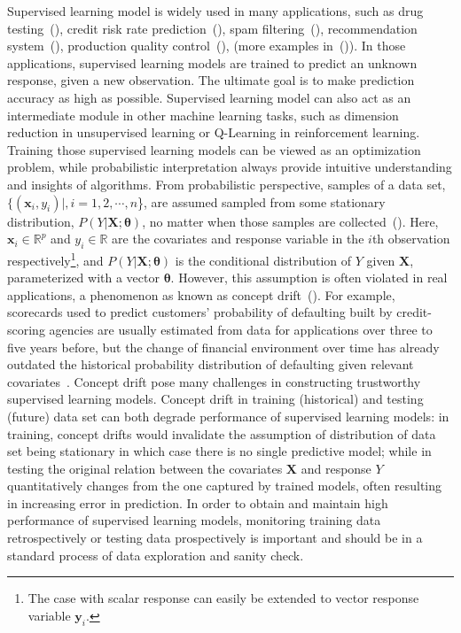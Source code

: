 \documentclass[twoside,11pt]{article}
\begin{document}
Supervised learning model is widely used in many applications, {such as} drug testing~(\cite{fong2015change}), credit risk rate prediction~(\cite{im2012time}), spam filtering~(\cite{carmona2010gnusmail}), recommendation system~(\cite{koren2009collaborative}), production quality control~(\cite{bui2018monitoring}), {(more examples in~(\cite{vzliobaite2016overview}))}. In those applications, supervised learning models are trained to predict an unknown response, given a new observation. The ultimate goal is to make prediction accuracy as high as possible. Supervised learning model can also act as an intermediate module in other machine learning tasks, such as dimension reduction in unsupervised learning or Q-Learning in reinforcement learning. Training those supervised learning models can be viewed as an optimization problem, while probabilistic interpretation always provide intuitive understanding and insights of algorithms. From probabilistic perspective, samples of a data set, {$\{ (\bm {x}_i, y_i)|, i=1,2,\cdots,n$\}}, are assumed sampled from some stationary distribution, $P (Y| \bm {X};\bm{\theta})$, no matter when those samples are collected~(\cite{hulten2001mining}). Here, {$\bm {x}_i \in \mathbb{R}^{p}$ and $y_i \in \mathbb{R}$ are the covariates and response variable in the $i$th observation respectively}\footnote{The case with scalar response can easily be extended to vector response variable $\bm {y}_i$.}, and $P (Y| \bm {X};\bm{\theta})$ is the conditional distribution of $Y$ given $\bm{X}$, parameterized with a vector $\bm{\theta}$. However, this assumption is often violated in real applications, a phenomenon as known as concept drift~(\cite{moreno2012unifying}). For example, scorecards used to predict customers' probability of defaulting built by credit-scoring agencies are usually estimated from data for applications over three to five years before, but the change of financial environment over time has already outdated the historical probability distribution of defaulting given relevant covariates~\cite{crook1992degradation,vzliobaite2016overview}. Concept drift pose many challenges in constructing trustworthy supervised learning models. Concept drift in training (historical) and testing (future) data set can both degrade performance of supervised learning models: in training, concept drifts would invalidate the assumption of distribution of data set being stationary in which case there is no single predictive model; while in testing the original relation between the covariates $\bm{X}$ and response $Y$ quantitatively changes from the one captured by trained models, often resulting in increasing error in prediction. In order to obtain and maintain high performance of supervised learning models, monitoring training data retrospectively or testing data prospectively is important and should be in a standard process of data exploration and sanity check.
\end{document}
